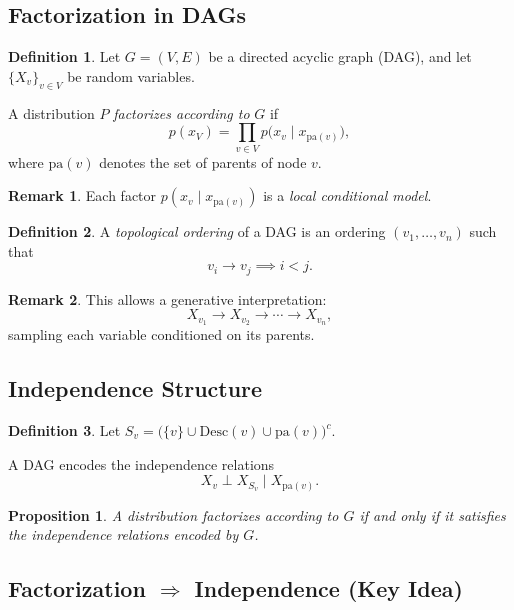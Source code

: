 \documentclass[12pt,oneside]{book}
\numberwithin{equation}{section}
\theoremstyle{definition}
\newtheorem{definition}{Definition}[section]
\newtheorem{remark}{Remark}[section]
\theoremstyle{plain}
\newtheorem{proposition}{Proposition}[section]
\theoremstyle{remark}
\begin{document}
\subsection{Factorization in DAGs}

\begin{definition}
Let $G = (V,E)$ be a directed acyclic graph (DAG), and let $\{X_v\}_{v \in V}$ be random variables.

A distribution $P$ \emph{factorizes according to} $G$ if
\[
p(x_V) = \prod_{v \in V} p\big(x_v \mid x_{\mathrm{pa}(v)}\big),
\]
where $\mathrm{pa}(v)$ denotes the set of parents of node $v$.
\end{definition}

\begin{remark}
Each factor $p(x_v \mid x_{\mathrm{pa}(v)})$ is a \emph{local conditional model}.
\end{remark}

\begin{definition}
A \emph{topological ordering} of a DAG is an ordering $(v_1,\dots,v_n)$ such that
\[
v_i \to v_j \implies i < j.
\]
\end{definition}

\begin{remark}
This allows a generative interpretation:
\[
X_{v_1} \to X_{v_2} \to \cdots \to X_{v_n},
\]
sampling each variable conditioned on its parents.
\end{remark}


\subsection{Independence Structure}

\begin{definition}
Let $S_v = \big(\{v\} \cup \mathrm{Desc}(v) \cup \mathrm{pa}(v)\big)^c$.

A DAG encodes the independence relations
\[
X_v \perp X_{S_v} \mid X_{\mathrm{pa}(v)}.
\]
\end{definition}

\begin{proposition}
A distribution factorizes according to $G$ if and only if it satisfies the independence relations encoded by $G$.
\end{proposition}


\subsection{Factorization $\Rightarrow$ Independence (Key Idea)}
\end{document}
